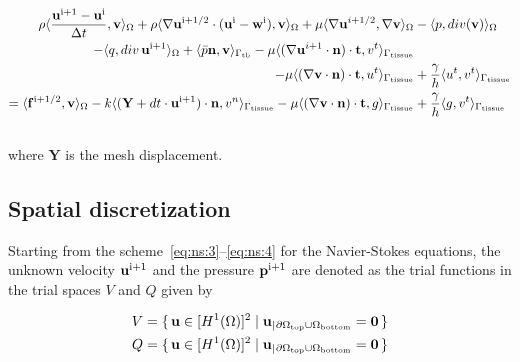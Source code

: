 \documentclass[11pt,a4paper,titlepage]{report}
\begin{document}
\begin{equation}
\begin{split}
\rho \langle \frac{\mathbf{u}^{\rm i+1} - \mathbf{u}^{\rm i}}{\Delta t}, \mathbf{v} \rangle_\Omega
+ \rho \langle \nabla \mathbf{u}^{\rm i+1/2} \cdot (\mathbf{u}^{\rm i} - \mathbf{w}^{\rm i}), \mathbf{v} \rangle_\Omega
+ \mu \langle \nabla \mathbf{u}^{i+1/2} , \nabla \mathbf{v} \rangle_\Omega
& - \langle p , div(\mathbf{v}) \rangle_\Omega \\
- \langle q , div \, \mathbf{u}^{\rm i+1} \rangle_\Omega
+ \langle \bar{p} \mathbf{n}, \mathbf{v} \rangle_{\Gamma_{\rm tb}}
- \mu \langle (\nabla \mathbf{u}^{i+1} \cdot \mathbf{n}) \cdot \mathbf{t} , v^t \rangle_{\Gamma_{\rm tissue}} \\
- \mu \langle (\nabla \mathbf{v} \cdot \mathbf{n}) \cdot \mathbf{t} , u^t \rangle_{\Gamma_{\rm tissue}} 
&+ \frac{\gamma}{h} \langle u^t , v^t \rangle_{\Gamma_{\rm tissue}} \\
= \langle \mathbf{f}^{\rm i + 1/2}, \mathbf{v} \rangle_\Omega
- k \langle (\mathbf{Y} + dt \cdot \mathbf{u}^{\rm i+1}) \cdot \mathbf{n}, v^n \rangle_{\Gamma_{\rm tissue}}
- \mu \langle (\nabla \mathbf{v} \cdot \mathbf{n}) \cdot \mathbf{t}, g \rangle_{\Gamma_{\rm tissue}}
&+ \frac{\gamma}{h} \langle g, v^t \rangle_{\Gamma_{\rm tissue}}
\end{split}
\end{equation}
\\
where $\mathbf{Y}$ is the mesh displacement.


\subsection{Spatial discretization}
Starting from the scheme~\eqref{eq:ns:3}--\eqref{eq:ns:4} for the Navier-Stokes equations, the unknown velocity $\mathbf{u}^{\rm i + 1}$ and the pressure $\mathbf{p}^{\rm i + 1}$ are denoted as the trial functions in the trial spaces $V$ and $Q$ given by

\begin{align*}
V &= \set{\mathbf{u} \in [H^1(\Omega)]^2 | \mathbf{u}_|{_{\partial \Omega_{\rm top} \cup \Omega_{\rm bottom}}} = \mathbf{0}} \\
Q &= \set{\mathbf{u} \in [H^1(\Omega)]^2 | \mathbf{u}_|{_{\partial \Omega_{\rm top} \cup \Omega_{\rm bottom}}} = \mathbf{0}}
\end{align*}
\end{document}
